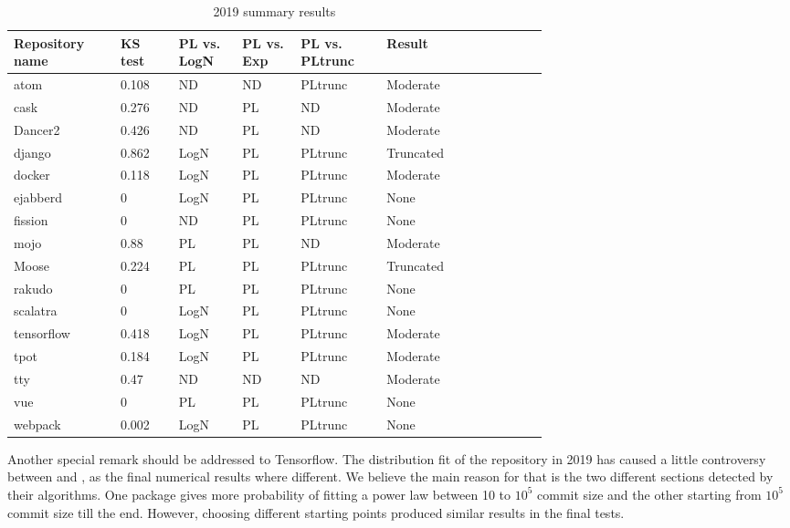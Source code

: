 \documentclass{article}
\begin{document}
%
\begin{table}[h!tbp]
  \caption{2019 summary results}
  \begin{center}
    \begin{tabular}{| p{0.12\linewidth} | p{0.08\linewidth} |
        p{0.08\linewidth} | p{0.08\linewidth} | p{0.1\linewidth}
        |p{0.13\linewidth} | p{0.09\linewidth} |}
      \hline
      Repository name & KS test & PL vs. LogN & PL vs. Exp & PL vs. PLtrunc & Result \\ 
      \hline
      atom &0.108 &ND &ND &PLtrunc & Moderate\\
      cask &0.276 &ND &PL &ND & Moderate \\
      Dancer2 &0.426 &ND &PL &ND & Moderate \\
      django &0.862 &LogN &PL &PLtrunc &Truncated \\
      docker &0.118 &LogN &PL &PLtrunc & Moderate \\
      ejabberd &0 &LogN &PL &PLtrunc & None\\
      fission &0 &ND &PL &PLtrunc & None \\
      mojo &0.88 &PL &PL &ND &Moderate \\
      Moose &0.224 &PL &PL &PLtrunc &Truncated \\
      rakudo &0 &PL &PL &PLtrunc & None \\
      scalatra &0 &LogN &PL &PLtrunc & None \\
      tensorflow &0.418 &LogN &PL &PLtrunc & Moderate \\
      tpot &0.184 &LogN &PL &PLtrunc & Moderate \\
      tty &0.47 &ND &ND &ND & Moderate \\
      vue &0 &PL &PL &PLtrunc & None \\
      webpack &0.002 &LogN &PL &PLtrunc & None\\
      \hline
    \end{tabular}
  \end{center}
  \label{tab:2019tests}
\end{table}
%
Another special remark should be addressed to Tensorflow. The
distribution fit of the repository in 2019 has caused a little
controversy between \cite{alstott2014powerlaw} and
\cite{gillespie2015power}, as the final numerical results where different.
 We believe the main reason for that is the
two different sections detected by their algorithms. One package gives
more probability of fitting a power law between 10 to $10^5$ commit
size and the other starting from $10^5$ commit size till the
end. However, choosing different starting points produced similar
results in the final tests. %
\end{document}
